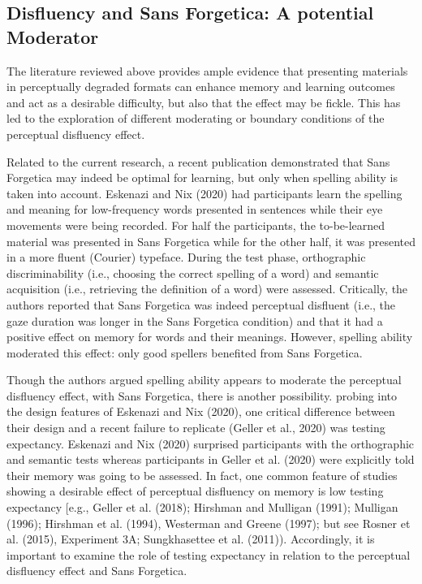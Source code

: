 \documentclass[
  english,
  jou]{apa7}
\begin{document}
\hypertarget{disfluency-and-sans-forgetica-a-potential-moderator}{%
\subsection{Disfluency and Sans Forgetica: A potential Moderator}\label{disfluency-and-sans-forgetica-a-potential-moderator}}

The literature reviewed above provides ample evidence that presenting materials in perceptually degraded formats can enhance memory and learning outcomes and act as a desirable difficulty, but also that the effect may be fickle. This has led to the exploration of different moderating or boundary conditions of the perceptual disfluency effect.

Related to the current research, a recent publication demonstrated that Sans Forgetica may indeed be optimal for learning, but only when spelling ability is taken into account. Eskenazi and Nix (2020) had participants learn the spelling and meaning for low-frequency words presented in sentences while their eye movements were being recorded. For half the participants, the to-be-learned material was presented in Sans Forgetica while for the other half, it was presented in a more fluent (Courier) typeface. During the test phase, orthographic discriminability (i.e., choosing the correct spelling of a word) and semantic acquisition (i.e., retrieving the definition of a word) were assessed. Critically, the authors reported that Sans Forgetica was indeed perceptual disfluent (i.e., the gaze duration was longer in the Sans Forgetica condition) and that it had a positive effect on memory for words and their meanings. However, spelling ability moderated this effect: only good spellers benefited from Sans Forgetica.

Though the authors argued spelling ability appears to moderate the perceptual disfluency effect, with Sans Forgetica, there is another possibility. probing into the design features of Eskenazi and Nix (2020), one critical difference between their design and a recent failure to replicate (Geller et al., 2020) was testing expectancy. Eskenazi and Nix (2020) surprised participants with the orthographic and semantic tests whereas participants in Geller et al. (2020) were explicitly told their memory was going to be assessed. In fact, one common feature of studies showing a desirable effect of perceptual disfluency on memory is low testing expectancy {[}e.g., Geller et al. (2018); Hirshman and Mulligan (1991); Mulligan (1996); Hirshman et al. (1994), Westerman and Greene (1997); but see Rosner et al. (2015), Experiment 3A; Sungkhasettee et al. (2011)). Accordingly, it is important to examine the role of testing expectancy in relation to the perceptual disfluency effect and Sans Forgetica.
\end{document}
